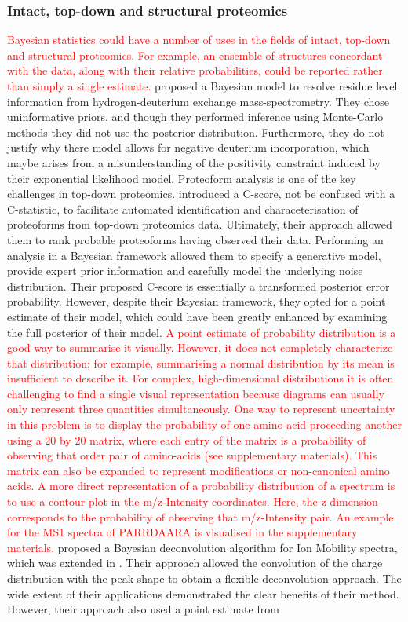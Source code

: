 \documentclass[12pt,english, journal=jpr, layout=twocolumn]{article}
\begin{document}
\subsubsection{Intact, top-down and structural proteomics}
 \textcolor{red}{Bayesian statistics could have a number of uses in the fields of intact, top-down and structural proteomics. For example, an ensemble of structures concordant with the data, along with their relative probabilities, could be reported rather than simply a single estimate.} \citet{Saltzberg::2017} proposed a Bayesian model to resolve residue level information from hydrogen-deuterium exchange mass-spectrometry. They chose uninformative priors, and though they performed inference using Monte-Carlo methods they did not use the posterior distribution. Furthermore, they do not justify why there model allows for negative deuterium incorporation, which maybe arises from a misunderstanding of the positivity constraint induced by their exponential likelihood model. Proteoform analysis is one of the key challenges in top-down proteomics. \citet{Leduc::2014} introduced a C-score, not be confused with a C-statistic, to facilitate automated identification and characeterisation of proteoforms from top-down proteomics data. Ultimately, their approach allowed them to rank probable proteoforms having observed their data. Performing an analysis in a Bayesian framework allowed them to specify a generative model, provide expert prior information and carefully model the underlying noise distribution. Their proposed C-score is essentially a transformed posterior error probability. However, despite their Bayesian framework, they opted for a point estimate of their model, which could have been greatly enhanced by examining the full posterior of their model. \textcolor{red}{A point estimate of probability distribution is a good way to summarise it visually. However, it does not completely characterize that distribution; for example, summarising a normal distribution by its mean is insufficient to describe it. For complex, high-dimensional distributions it is often challenging to find a single visual representation because diagrams can usually only represent three quantities simultaneously. One way to represent uncertainty in this problem is to display the probability of one amino-acid proceeding another using a 20 by 20 matrix, where each entry of the matrix is a probability of observing that order pair of amino-acids (see supplementary materials). This matrix can also be expanded to represent modifications or non-canonical amino acids. A more direct representation of a probability distribution of a spectrum is to use a contour plot in the m/z-Intensity coordinates. Here, the z dimension corresponds to the probability of observing that m/z-Intensity pair. An example for the MS1 spectra of PARRDAARA is visualised in the supplementary materials. } \citet{Marty::2015} proposed a Bayesian deconvolution algorithm for Ion Mobility spectra, which was extended in \citet{Kostelic::2021}. Their approach allowed the convolution of the charge distribution with the peak shape to obtain a flexible deconvolution approach. The wide extent of their applications demonstrated the clear benefits of their method. However, their approach also used a point estimate from 
\end{document}
